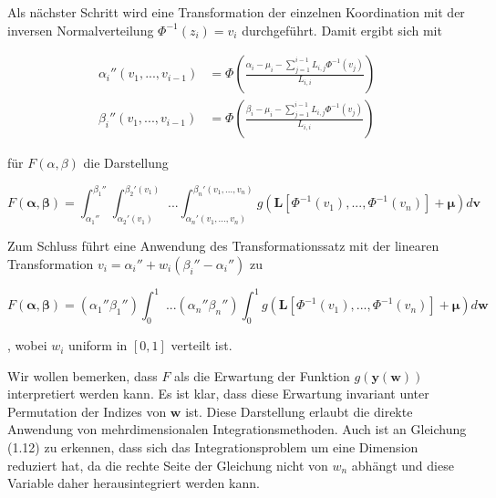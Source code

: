\documentclass[12pt,a4paper]{scrartcl}
\numberwithin{equation}{section}
\begin{document}
Als nächster Schritt wird eine Transformation der einzelnen Koordination mit der inversen Normalverteilung $\Phi^{-1}(z_i) = v_i$ durchgeführt. Damit ergibt sich mit

\begin{equation}
\begin{split}
 \alpha_i''(v_1,...,v_{i-1})&=  \Phi (\frac{\alpha_i - \mu_i - \sum_{j=1}^{i-1} L_{i,j}\Phi^{-1}(v_j)}{L_{i,i}} )\\
 \beta_i''(v_1,...,v_{i-1})&=  \Phi(\frac{\beta_i - \mu_i - \sum_{j=1}^{i-1} L_{i,j}\Phi^{-1}(v_j)}{L_{i,i}} )
 \end{split}
\end{equation}

für $F(\alpha,\beta)$ die Darstellung

\begin{equation}
  F(\mathbf{\alpha},\mathbf{\beta}) = \int_{\alpha_1''}^{\beta_1''} \int_{\alpha_2'(v_1)}^{\beta_2'(v_1)} \text{ ...} \int_{\alpha_n'(v_1,...,v_n)}^{\beta_n'(v_1,...,v_n)} g(\mathbf{L}[\Phi^{-1}(v_1),...,\Phi^{-1}(v_n)] + \mathbf{\mu}) d\mathbf{v}
\end{equation}

Zum Schluss führt eine Anwendung des Transformationssatz mit der linearen Transformation $v_i = \alpha_i'' + w_i(\beta_i''-\alpha_i'')$ zu

\begin{equation}
  F(\mathbf{\alpha},\mathbf{\beta}) = (\alpha_1'' \beta_1'') \int_{0}^{1} \text{ ...}(\alpha_n'' \beta_n'') \int_{0}^{1} g(\mathbf{L}[\Phi^{-1}(v_1),...,\Phi^{-1}(v_n)] + \mathbf{\mu}) d\mathbf{w}
\end{equation}

, wobei $w_i$ uniform in $[0,1]$ verteilt ist.

Wir wollen bemerken, dass $F$ als die Erwartung der Funktion $g(\mathbf{y(w)})$ interpretiert werden kann. Es ist klar, dass diese Erwartung invariant unter Permutation der Indizes
von $\mathbf{w}$ ist. Diese Darstellung erlaubt die direkte Anwendung von mehrdimensionalen Integrationsmethoden.
Auch ist an Gleichung (1.12) zu erkennen, dass sich das Integrationsproblem um eine Dimension
reduziert hat, da die rechte Seite der Gleichung nicht von $w_n$ abhängt und diese Variable daher
herausintegriert werden kann.
 
\end{document}
